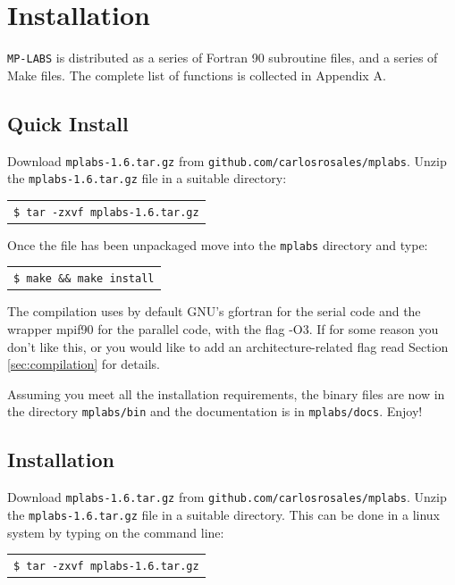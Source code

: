 \documentclass[12pt]{report}
\begin{document}
\tableofcontents
\pagebreak
\section*{}
\pagebreak


\chapter{Installation}
\verb+MP-LABS+ is distributed as a series of Fortran 90 subroutine files, and a series of Make files. The complete list of functions is collected in Appendix A.

\section{Quick Install}
Download \verb+mplabs-1.6.tar.gz+ from \verb+github.com/carlosrosales/mplabs+. Unzip the \verb+mplabs-1.6.tar.gz+ file in a suitable directory:

\begin{tabular}{l}
\texttt{\$ tar -zxvf mplabs-1.6.tar.gz}
\end{tabular}

Once the file has been unpackaged move into the \verb+mplabs+ directory and type:

\begin{tabular}{l}
\texttt{\$ make \&\& make install}
\end{tabular}

The compilation uses by default GNU's gfortran for the serial code and the wrapper mpif90 for the parallel code, with the flag -O3. If for some reason you don't like this, or you would like to add an architecture-related flag read Section \ref{sec:compilation} for details. 

Assuming you meet all the installation requirements, the binary files are now in the directory \verb+mplabs/bin+ and the documentation is in \verb+mplabs/docs+. Enjoy!


\section{Installation}
Download \verb+mplabs-1.6.tar.gz+ from \verb+github.com/carlosrosales/mplabs+. Unzip the \verb+mplabs-1.6.tar.gz+ file in a suitable directory. This can be done in a linux system by typing on the command line:

\begin{tabular}{l}
\texttt{\$ tar -zxvf mplabs-1.6.tar.gz}
\end{tabular}
\end{document}
